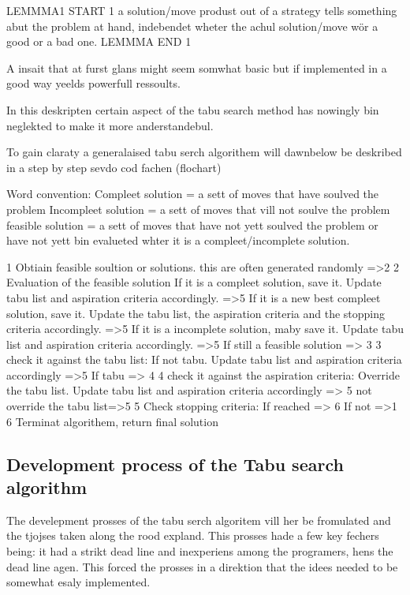 LEMMMA1 START 1
a solution/move produst out of a strategy tells something abut the problem at hand, indebendet wheter the achul solution/move wör a good or a bad one.
LEMMMA END 1

A insait that at furst glans might seem somwhat basic but if implemented in a good way yeelds powerfull ressoults.

In this deskripten certain aspect of the tabu search method has nowingly bin neglekted to make it more anderstandebul. 
 
To gain claraty a generalaised tabu serch algorithem will dawnbelow be deskribed in a step by step sevdo cod fachen (flochart)

Word convention: 
Compleet solution = a sett of moves that have soulved the problem
Incompleet solution = a sett of moves that vill not soulve the problem
feasible solution = a sett of moves that have not yett soulved the problem or have not yett bin evalueted whter it is a compleet/incomplete solution.


1
Obtiain feasible soultion or solutions. this are often generated randomly  =>2
2
Evaluation of the feasible solution
If it is a compleet solution, save it. Update tabu list and aspiration criteria accordingly. =>5
If it is a new best compleet solution, save it. Update  the tabu list, the aspiration criteria and the stopping criteria accordingly. =>5
If it is a incomplete solution, maby save it. Update tabu list and aspiration criteria accordingly. =>5
If still a feasible solution => 3
3
check it against the tabu list:
If not tabu. Update tabu list and aspiration criteria accordingly =>5
If tabu => 4
4
check it against the aspiration criteria:
Override the tabu list. Update tabu list and aspiration criteria accordingly => 5
not override the tabu list=>5
5
Check stopping criteria:
If reached => 6
If not =>1
6
Terminat algorithem, return final solution



\subsection{Development process of the Tabu search algorithm}

The develepment prosses of the tabu serch algoritem vill her be fromulated and the tjojses taken along the rood expland.
This prosses hade a few key fechers being: it had a strikt dead line and inexperiens among the programers, hens the dead line agen. This forced the prosses in a direktion that the idees needed to be somewhat esaly implemented. 

